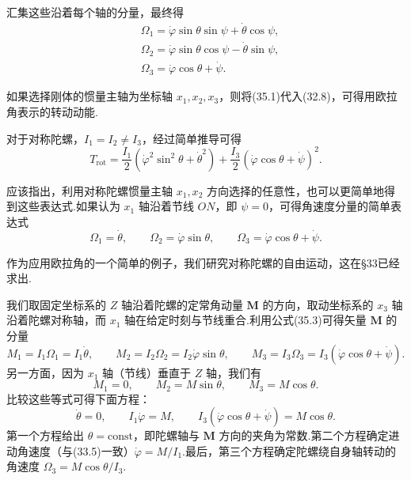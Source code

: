 汇集这些沿着每个轴的分量，最终得
\begin{equation}
\begin{aligned}
  &\Omega_1=\dot{\varphi}\sin\theta\sin\psi+\dot{\theta}\cos\psi,\\
  &\Omega_2=\dot{\varphi}\sin\theta\cos\psi-\dot{\theta}\sin\psi,\\
  &\Omega_3=\dot{\varphi}\cos\theta+\dot{\psi}.
\end{aligned}
\end{equation}

如果选择刚体的惯量主轴为坐标轴 $x_1,x_2,x_3$，则将(35.1)代入(32.8)，可得用欧拉角表示的转动动能.

对于对称陀螺，$I_1=I_2\neq I_3$，经过简单推导可得
\begin{equation}
  T_{\mathrm{rot}}=\frac{I_1}{2}\left(\dot{\varphi}^2\sin^2\theta+\dot{\theta}^2\right)
  +\frac{I_3}{2}\left(\dot{\varphi}\cos\theta+\dot{\psi}\right)^2.
\end{equation}

应该指出，利用对称陀螺惯量主轴 $x_1,x_2$ 方向选择的任意性，也可以更简单地得到这些表达式.如果认为 $x_1$ 轴沿着节线 $ON$，即 $\psi=0$，可得角速度分量的简单表达式
\begin{equation}
  \Omega_1=\dot{\theta},\qquad
  \Omega_2=\dot{\varphi}\sin\theta,\qquad
  \Omega_3=\dot{\varphi}\cos\theta+\dot{\psi}.
\end{equation}

作为应用欧拉角的一个简单的例子，我们研究对称陀螺的自由运动，这在§33已经求出.

我们取固定坐标系的 $Z$ 轴沿着陀螺的定常角动量 $\boldsymbol{M}$ 的方向，取动坐标系的 $x_3$ 轴沿着陀螺对称轴，而 $x_1$ 轴在给定时刻与节线重合.利用公式(35.3)可得矢量 $\boldsymbol{M}$ 的分量
\begin{equation*}
  M_1=I_1\Omega_1=I_1\dot{\theta},\qquad
  M_2=I_2\Omega_2=I_2\dot{\varphi}\sin\theta,\qquad
  M_3=I_3\Omega_3=I_3(\dot{\varphi}\cos\theta+\dot{\psi}).
\end{equation*}
另一方面，因为 $x_1$ 轴（节线）垂直于 $Z$ 轴，我们有
\begin{equation*}
  M_1=0,\qquad
  M_2=M\sin\theta,\qquad
  M_3=M\cos\theta.
\end{equation*}
比较这些等式可得下面方程：
\begin{equation}
  \dot{\theta}=0,\qquad
  I_1\dot{\varphi}=M,\qquad
  I_3(\dot{\varphi}\cos\theta+\dot{\psi})=M\cos\theta.
\end{equation}
第一个方程给出 $\theta=\mathrm{const}$，即陀螺轴与 $\boldsymbol{M}$ 方向的夹角为常数.第二个方程确定进动角速度（与(33.5)一致）$\dot{\varphi}=M/I_1$.最后，第三个方程确定陀螺绕自身轴转动的角速度 $\Omega_3=M\cos\theta/I_3$.

